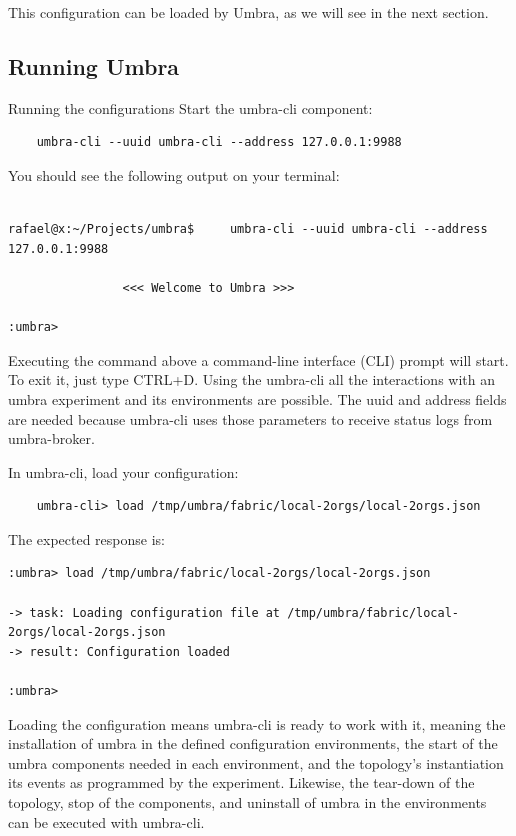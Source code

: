 \documentclass[12pt,a4paper]{article}
\theoremstyle{definition}
\begin{document}
This configuration can be loaded by Umbra, as we will see in the next section.

\subsection{Running Umbra}

Running the configurations
Start the umbra-cli component:
\begin{verbatim}
    umbra-cli --uuid umbra-cli --address 127.0.0.1:9988

\end{verbatim}

You should see the following output on your terminal:


\begin{verbatim}

rafael@x:~/Projects/umbra$     umbra-cli --uuid umbra-cli --address 127.0.0.1:9988

                <<< Welcome to Umbra >>>                

:umbra> 
\end{verbatim}


Executing the command above a command-line interface (CLI) prompt will start. To exit it, just type CTRL+D. Using the umbra-cli all the interactions with an umbra experiment and its environments are possible. The uuid and address fields are needed because umbra-cli uses those parameters to receive status logs from umbra-broker.

In umbra-cli, load your configuration:

\begin{verbatim}
    umbra-cli> load /tmp/umbra/fabric/local-2orgs/local-2orgs.json

\end{verbatim}

The expected response is:
\begin{verbatim}
:umbra> load /tmp/umbra/fabric/local-2orgs/local-2orgs.json

-> task: Loading configuration file at /tmp/umbra/fabric/local-2orgs/local-2orgs.json
-> result: Configuration loaded

:umbra> 

\end{verbatim}


Loading the configuration means umbra-cli is ready to work with it, meaning the installation of umbra in the defined configuration environments, the start of the umbra components needed in each environment, and the topology's instantiation its events as programmed by the experiment. Likewise, the tear-down of the topology, stop of the components, and uninstall of umbra in the environments can be executed with umbra-cli.
\end{document}
